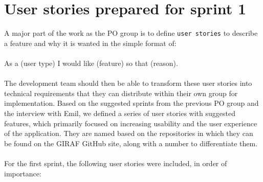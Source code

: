 \section{User stories prepared for sprint 1}\label{pre-sprint-1-user-stories}
A major part of the work as the PO group is to define \texttt{user stories} to describe a feature and why it is wanted in the simple format of:
\\\\
As a (user type) I would like (feature) so that (reason).
\\\\
The development team should then be able to transform these user stories into technical requirements that they can distribute within their own group for implementation.
Based on the suggested sprints from the previous PO group and the interview with Emil, we defined a series of user stories with suggested features, which primarily focused on increasing usability and the user experience of the application.
They are named based on the repositories in which they can be found on the GIRAF GitHub site, along with a number to differentiate them.
\\\\
For the first sprint, the following user stories were included, in order of importance:

